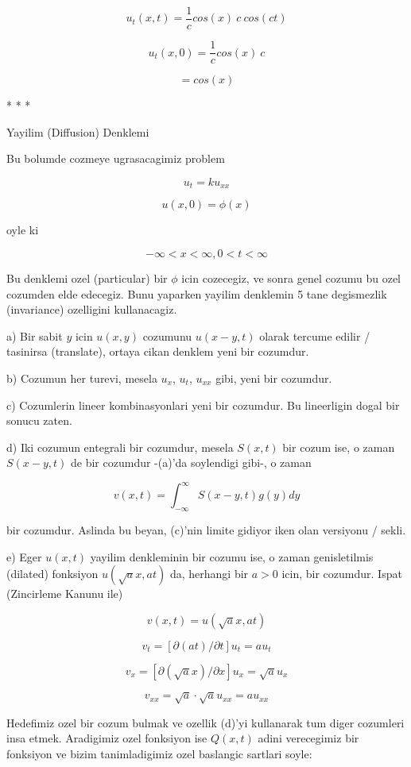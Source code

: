 \documentclass[12pt,fleqn]{article}\usepackage{../common}
\begin{document}
\[ u_t(x,t) = \frac{1}{c}cos(x) \ c \ cos(ct) \]

\[ u_t(x,0) = \frac{1}{c}cos(x) \ c \]

\[  = cos(x) \]


* * * 


Yayilim (Diffusion) Denklemi

Bu bolumde cozmeye ugrasacagimiz problem

\[  u_t = k u_{xx}  \]

\[ u(x,0) = \phi(x) \]

oyle ki 

\[ -\infty < x < \infty, 0 < t < \infty \]

Bu denklemi ozel (particular) bir $\phi$ icin cozecegiz, ve sonra genel
cozumu bu ozel cozumden elde edecegiz. Bunu yaparken yayilim denklemin 5
tane degismezlik (invariance) ozelligini kullanacagiz.

a) Bir sabit $y$ icin $u(x,y)$ cozumunu $u(x-y,t)$ olarak tercume edilir /
tasinirsa (translate), ortaya cikan denklem yeni bir cozumdur.

b) Cozumun her turevi, mesela $u_x$, $u_t$, $u_{xx}$ gibi, yeni bir
cozumdur. 

c) Cozumlerin lineer kombinasyonlari yeni bir cozumdur. Bu lineerligin
dogal bir sonucu zaten.

d) Iki cozumun entegrali bir cozumdur, mesela $S(x,t)$ bir cozum ise, o
zaman $S(x-y,t)$ de bir cozumdur -(a)'da soylendigi gibi-, o zaman

\[ v(x,t) = \int_{-\infty}^{\infty}S(x-y,t)g(y) dy   \]

bir cozumdur. Aslinda bu beyan, (c)'nin limite gidiyor iken olan versiyonu
/ sekli.

e) Eger $u(x,t)$ yayilim denkleminin bir cozumu ise, o zaman genisletilmis
(dilated) fonksiyon $u(\sqrt{a} x, at)$ da, herhangi bir $a>0$ icin, bir
cozumdur. Ispat (Zincirleme Kanunu ile)

\[ v(x,t) =  u(\sqrt{a} x, at) \]

\[ v_t = [\partial(at) / \partial t]u_t = au_t \]

\[ v_x = [\partial(\sqrt{a}x) / \partial x]u_x = \sqrt{a}u_x \]

\[ v_{xx} = \sqrt{a} \cdot \sqrt{a} u_{xx} = a u_{xx} \]

Hedefimiz ozel bir cozum bulmak ve ozellik (d)'yi kullanarak tum diger
cozumleri insa etmek. Aradigimiz ozel fonksiyon ise $Q(x,t)$ adini
verecegimiz  bir fonksiyon ve bizim tanimladigimiz ozel baslangic
sartlari soyle:
\end{document}
